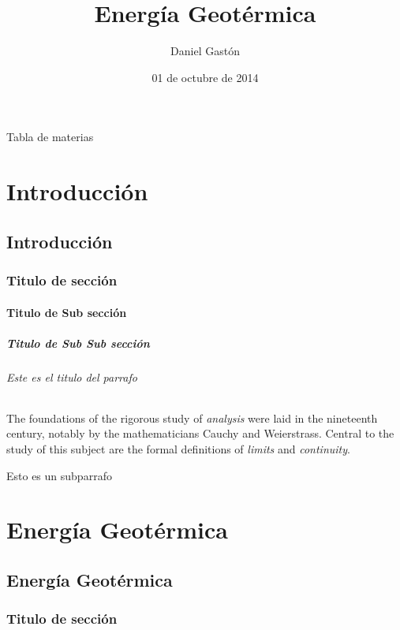\documentclass[a4paper,12pt]{report}
\begin{document}
\renewcommand{\tableofcontents}{Tabla de materias}

\author{Daniel Gastón}
\title{Energía Geotérmica}
\date{01 de octubre de 2014}
\maketitle


\tableofcontents



\part{Introducción}
\chapter{Introducción}
\section{Titulo de sección}

\subsection{Titulo de Sub sección}
\subsubsection{Titulo de Sub Sub sección}


\paragraph{Este es el titulo del parrafo}
The foundations of the rigorous study of \emph{analysis}
were laid in the nineteenth century, notably by the
mathematicians Cauchy and Weierstrass. Central to the
study of this subject are the formal definitions of
\emph{limits} and \emph{continuity}.
\subparagraph{Esto es un subparrafo}

\part{Energía Geotérmica}
\chapter{Energía Geotérmica}
\section{Titulo de sección}
\end{document}
